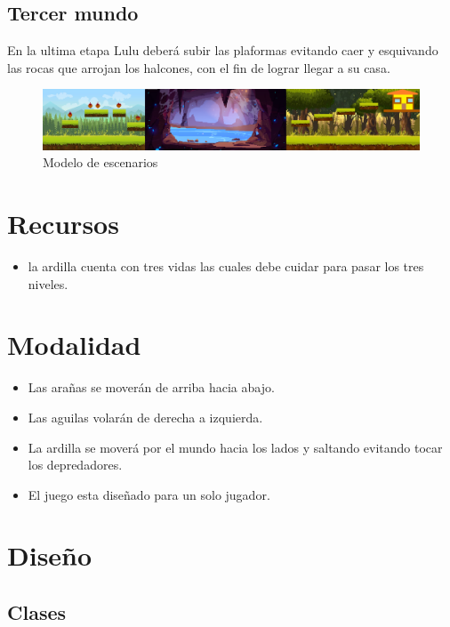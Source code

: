 \documentclass{article}
\begin{document}
\subsection{Tercer mundo}
En la ultima etapa Lulu deberá subir las plaformas evitando caer y esquivando las rocas que arrojan los halcones, con el fin de lograr llegar a su casa. 

\vspace{0.5cm}


\begin{figure}[h]
\includegraphics[width=13cm]{Modelo, juego.png}
\centering
\caption{Modelo de escenarios}
\label{fig:Modelo, juego}
\end{figure}


\section{Recursos}
\begin{itemize}
    \item la ardilla cuenta con tres vidas las cuales debe cuidar para pasar los tres niveles. 
    
\end{itemize}

\newpage

\section{Modalidad}
\begin{itemize}

    \item Las arañas se moverán de arriba hacia abajo.
    \item Las aguilas volarán de derecha a izquierda.
    \item La ardilla se moverá por el mundo hacia los lados y saltando evitando tocar los depredadores.
    \item El juego esta diseñado para un solo jugador.
\end{itemize}


\section{Diseño}

\subsection {Clases}
\end{document}
